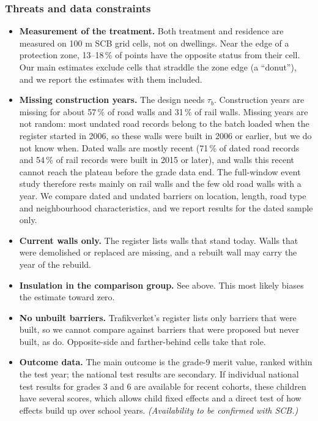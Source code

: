 \documentclass[11pt]{article}
\begin{document}
\subsubsection{Threats and data constraints}

\begin{itemize}
\item \textbf{Measurement of the treatment.} Both treatment and residence are measured on 100 m SCB grid cells, not on dwellings. Near the edge of a protection zone, 13--18\,\% of points have the opposite status from their cell. Our main estimates exclude cells that straddle the zone edge (a ``donut''), and we report the estimates with them included.
\item \textbf{Missing construction years.} The design needs \(\tau_b\). Construction years are missing for about 57\,\% of road walls and 31\,\% of rail walls. Missing years are not random: most undated road records belong to the batch loaded when the register started in 2006, so these walls were built in 2006 or earlier, but we do not know when. Dated walls are mostly recent (71\,\% of dated road records and 54\,\% of rail records were built in 2015 or later), and walls this recent cannot reach the plateau before the grade data end. The full-window event study therefore rests mainly on rail walls and the few old road walls with a year. We compare dated and undated barriers on location, length, road type and neighbourhood characteristics, and we report results for the dated sample only.
\item \textbf{Current walls only.} The register lists walls that stand today. Walls that were demolished or replaced are missing, and a rebuilt wall may carry the year of the rebuild.
\item \textbf{Insulation in the comparison group.} See above. This most likely biases the estimate toward zero.
\item \textbf{No unbuilt barriers.} Trafikverket's register lists only barriers that were built, so we cannot compare against barriers that were proposed but never built, as \textcite{morettiTrafficNoiseExternality2025} do. Opposite-side and farther-behind cells take that role.
\item \textbf{Outcome data.} The main outcome is the grade-9 merit value, ranked within the test year; the national test results are secondary. If individual national test results for grades 3 and 6 are available for recent cohorts, these children have several scores, which allows child fixed effects and a direct test of how effects build up over school years. \emph{(Availability to be confirmed with SCB.)}

\end{itemize}
\end{document}
